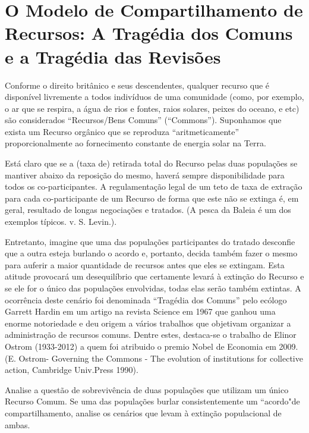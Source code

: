 \section{O Modelo de Compartilhamento de Recursos: A Tragédia dos Comuns e a Tragédia das Revisões}

    Conforme o direito britânico e seus descendentes, qualquer recurso que é disponível livremente a todos indivíduos de uma comunidade (como, por exemplo, o ar que se respira, a água de rios e fontes, raios solares, peixes do oceano, e etc) são considerados ``Recursos/Bens Comuns'' (``Commons''). Suponhamos que exista um Recurso orgânico que se reproduza ``aritmeticamente'' proporcionalmente ao fornecimento constante de energia solar na Terra.

    Está claro que se a (taxa de) retirada total do Recurso pelas duas populações se mantiver abaixo da reposição do mesmo, haverá sempre disponibilidade para todos os co-participantes. A regulamentação legal de um teto de taxa de extração para cada co-participante de um Recurso de forma que este não se extinga é, em geral, resultado de longas negociações e tratados. (A pesca da Baleia é um dos exemplos típicos. v. S. Levin.).

    Entretanto, imagine que uma das populações participantes do tratado desconfie que a outra esteja burlando o acordo e, portanto, decida também fazer o mesmo para auferir a maior quantidade de recursos antes que eles se extingam. Esta atitude provocará um desequilíbrio que certamente levará à extinção do Recurso e se ele for o único das populações envolvidas, todas elas serão também extintas. A ocorrência deste cenário foi denominada ``Tragédia dos Comuns'' pelo ecólogo Garrett Hardin em um artigo na revista Science em 1967 que ganhou uma enorme notoriedade e deu origem a vários trabalhos que objetivam organizar a administração de recursos comuns. Dentre estes, destaca-se o trabalho de Elinor Ostrom (1933-2012) a quem foi atribuido o premio Nobel de Economia em 2009. (E. Ostrom- Governing the Commons - The evolution of institutions for collective action, Cambridge Univ.Press 1990). 


\begin{exercise}
    Analise a questão de sobrevivência de duas populações que utilizam um único Recurso Comum. Se uma das populações burlar consistentemente um ``acordo"de compartilhamento, analise os cenários que levam à extinção populacional de ambas.
\end{exercise}

